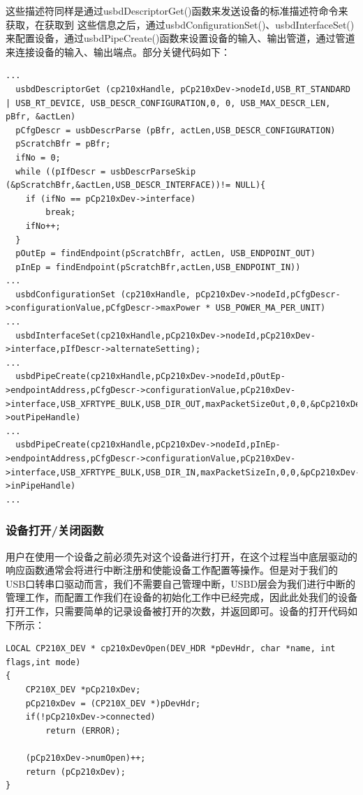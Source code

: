 这些描述符同样是通过usbdDescriptorGet()函数来发送设备的标准描述符命令来获取，在获取到
这些信息之后，通过usbdConfigurationSet()、usbdInterfaceSet()来配置设备，通过usbdPipeCreate()函数来设置设备的输入、输出管道，通过管道来连接设备的输入、输出端点。部分关键代码如下：
\lstset{language=C}
\begin{lstlisting}
...  
  usbdDescriptorGet (cp210xHandle, pCp210xDev->nodeId,USB_RT_STANDARD | USB_RT_DEVICE, USB_DESCR_CONFIGURATION,0, 0, USB_MAX_DESCR_LEN, pBfr, &actLen) 
  pCfgDescr = usbDescrParse (pBfr, actLen,USB_DESCR_CONFIGURATION)
  pScratchBfr = pBfr;
  ifNo = 0;
  while ((pIfDescr = usbDescrParseSkip (&pScratchBfr,&actLen,USB_DESCR_INTERFACE))!= NULL){
    if (ifNo == pCp210xDev->interface)
		break;
	ifNo++;
  }
  pOutEp = findEndpoint(pScratchBfr, actLen, USB_ENDPOINT_OUT)
  pInEp = findEndpoint(pScratchBfr,actLen,USB_ENDPOINT_IN))
...  
  usbdConfigurationSet (cp210xHandle, pCp210xDev->nodeId,pCfgDescr->configurationValue,pCfgDescr->maxPower * USB_POWER_MA_PER_UNIT)
...  
  usbdInterfaceSet(cp210xHandle,pCp210xDev->nodeId,pCp210xDev->interface,pIfDescr->alternateSetting);
...  
  usbdPipeCreate(cp210xHandle,pCp210xDev->nodeId,pOutEp->endpointAddress,pCfgDescr->configurationValue,pCp210xDev->interface,USB_XFRTYPE_BULK,USB_DIR_OUT,maxPacketSizeOut,0,0,&pCp210xDev->outPipeHandle)
...  
  usbdPipeCreate(cp210xHandle,pCp210xDev->nodeId,pInEp->endpointAddress,pCfgDescr->configurationValue,pCp210xDev->interface,USB_XFRTYPE_BULK,USB_DIR_IN,maxPacketSizeIn,0,0,&pCp210xDev->inPipeHandle)
...
\end{lstlisting}


\subsubsection{设备打开/关闭函数}

	用户在使用一个设备之前必须先对这个设备进行打开，在这个过程当中底层驱动的响应函数通常会将进行中断注册和使能设备工作配置等操作。但是对于我们的USB口转串口驱动而言，我们不需要自己管理中断，USBD层会为我们进行中断的管理工作，而配置工作我们在设备的初始化工作中已经完成，因此此处我们的设备打开工作，只需要简单的记录设备被打开的次数，并返回即可。设备的打开代码如下所示：
	
\lstset{language=C}
\begin{lstlisting}
LOCAL CP210X_DEV * cp210xDevOpen(DEV_HDR *pDevHdr, char *name, int flags,int mode)
{
	CP210X_DEV *pCp210xDev;
	pCp210xDev = (CP210X_DEV *)pDevHdr;
	if(!pCp210xDev->connected)	
		return (ERROR);
		
	(pCp210xDev->numOpen)++;
	return (pCp210xDev);
}
\end{lstlisting}

